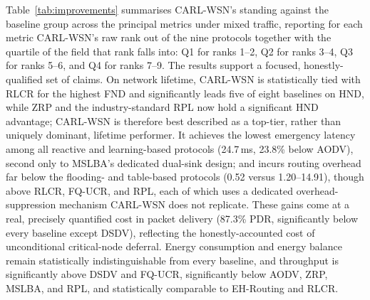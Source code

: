 \documentclass[12pt]{article}
\begin{document}
Table~\ref{tab:improvements} summarises CARL-WSN's standing against
the baseline group across the principal metrics under mixed traffic,
reporting for each metric CARL-WSN's raw rank out of the nine
protocols together with the quartile of the field that rank falls
into: Q1 for ranks 1--2, Q2 for ranks 3--4, Q3 for ranks 5--6, and Q4
for ranks 7--9. The results support a focused, honestly-qualified set
of claims.
On network lifetime, CARL-WSN is statistically tied with RLCR for
the highest FND and significantly leads five of eight baselines on
HND, while ZRP and the industry-standard RPL now hold a significant
HND advantage; CARL-WSN is therefore best described as a top-tier,
rather than uniquely dominant, lifetime performer. It achieves the
lowest emergency latency among all reactive and learning-based
protocols (24.7\,ms, 23.8\% below AODV), second only to MSLBA's
dedicated dual-sink design; and incurs routing overhead far below
the flooding- and table-based protocols (0.52 versus 1.20--14.91),
though above RLCR, FQ-UCR, and RPL, each of which uses a dedicated
overhead-suppression mechanism CARL-WSN does not replicate. These
gains come at a real, precisely quantified cost in packet delivery
(87.3\% PDR, significantly below every baseline except DSDV),
reflecting the honestly-accounted cost of unconditional
critical-node deferral. Energy consumption and energy balance remain
statistically indistinguishable from every baseline, and throughput
is significantly above DSDV and FQ-UCR, significantly below AODV,
ZRP, MSLBA, and RPL, and statistically comparable to EH-Routing and
RLCR.
\end{document}
